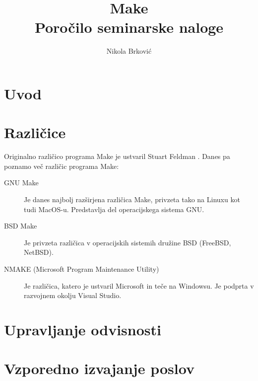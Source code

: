 \documentclass[notitlepage]{report}
\title{%
  Make \\
  \large Poročilo seminarske naloge
}
\author{Nikola Brković}
\begin{document}
\maketitle

\begin{abstract}
\end{abstract}

\section*{Uvod}

\section*{Različice}

Originalno različico programa Make je ustvaril Stuart Feldman
\cite{acm-award}. Danes pa poznamo več različic programa Make:

\begin{description}
\item[GNU Make] Je danes najbolj razširjena različica Make, privzeta
  tako na Linuxu kot tudi MacOS-u. Predstavlja del operacijskega
  sistema GNU.
  
\item[BSD Make] Je privzeta različica v operacijskih sistemih družine
  BSD (FreeBSD, NetBSD).

\item[NMAKE (Microsoft Program Maintenance Utility)] Je različica,
  katero je ustvaril Microsoft in teče na Windowsu. Je podprta v
  razvojnem okolju Visual Studio.
\end{description}
  
\section*{Upravljanje odvisnosti}

\section*{Vzporedno izvajanje poslov}


\end{document}
